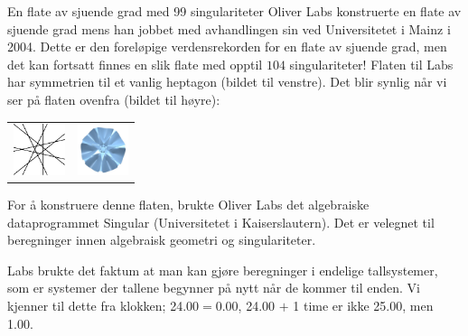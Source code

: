 \begin{surferPage}{En flate av sjuende grad med 99 singulariteter}
	Oliver Labs konstruerte en flate av sjuende grad mens han jobbet med avhandlingen sin 
	ved Universitetet i Mainz i 2004. Dette er den foreløpige verdensrekorden for en flate av sjuende 
	grad, men det kan fortsatt finnes en slik flate med opptil $104$ singulariteter! Flaten til Labs har 
	symmetrien til et vanlig heptagon (bildet til venstre). Det blir synlig når vi ser på flaten ovenfra (bildet til høyre):
	
    \vspace*{-0.3em}
    \begin{center}
      \begin{tabular}{c@{\qquad}c}
        \includegraphics[height=1.5cm]{./../../common/images/labsseptic1.pdf}
        &
        \includegraphics[height=1.5cm]{./../../common/images/labs_septic_von_oben}
      \end{tabular}
    \end{center}
    \vspace*{-0.3em}
	
	For å konstruere denne flaten, brukte Oliver Labs det algebraiske dataprogrammet {\sc Singular} 
	(Universitetet i Kaiserslautern). Det er velegnet til beregninger innen algebraisk geometri og singulariteter. 

	Labs brukte det faktum at man kan gjøre beregninger i endelige tallsystemer, som er systemer der tallene begynner 
	på nytt når de kommer til enden. Vi kjenner til dette fra klokken; 24.00$=$0.00, 24.00 $+$ 1 time er ikke 25.00, men 1.00.
\end{surferPage}
